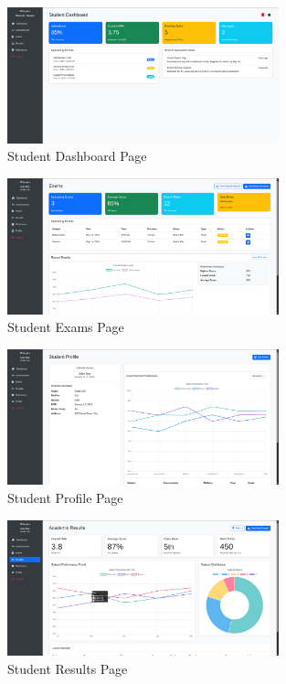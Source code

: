 \documentclass[12pt,a4paper]{report}
\begin{document}
\begin{figure}[htbp]
    \centering
    \includegraphics[width=0.7\textwidth]{student-dashboard-page.png}
    \caption{Student Dashboard Page}
    \label{fig:student-dashboard-page}
\end{figure}

\begin{figure}[htbp]
    \centering
    \includegraphics[width=0.7\textwidth]{student-exams-page.png}
    \caption{Student Exams Page}
    \label{fig:student-exams-page}
\end{figure}

\begin{figure}[htbp]
    \centering
    \includegraphics[width=0.7\textwidth]{student-profile-page.png}
    \caption{Student Profile Page}
    \label{fig:student-profile-page}
\end{figure}

\begin{figure}[htbp]
    \centering
    \includegraphics[width=0.7\textwidth]{student-results-page.png}
    \caption{Student Results Page}
    \label{fig:student-results-page}
\end{figure}
\end{document}
